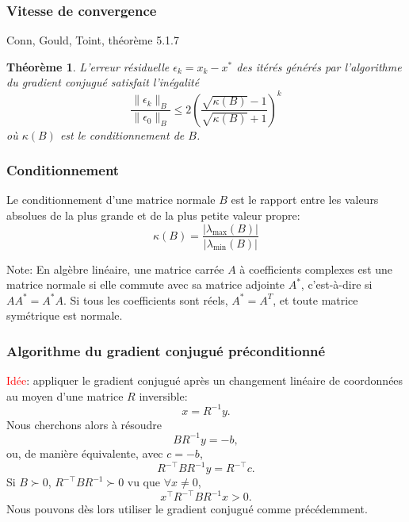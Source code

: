 \documentclass[usepdftitle=false,aspectratio=169]{beamer}
\newtheorem{thm}{Théorème}
\begin{document}
\begin{frame}
\frametitle{Vitesse de convergence}

Conn, Gould, Toint, théorème 5.1.7

\begin{thm}
L'erreur résiduelle $\epsilon_k = x_k - x^*$ des itérés générés par l'algorithme du gradient conjugué satisfait l'inégalité
$$
\frac{\| \epsilon_k \|_B}{\| \epsilon_0 \|_B}
\leq 2\left( \frac{\sqrt{\kappa(B)}-1}{\sqrt{\kappa(B)}+1} \right)^k
$$
où $\kappa(B)$ est le conditionnement de $B$.
\end{thm}

\end{frame}

\begin{frame}
\frametitle{Conditionnement}

Le conditionnement d'une matrice normale $B$ est le rapport entre les valeurs absolues de la plus grande et de la plus petite valeur propre:
$$
\kappa(B) = \frac{| \lambda_{\max}(B) |}{| \lambda_{\min}(B) |}
$$

\mbox{}

Note: En algèbre linéaire, une matrice carrée $A$ à coefficients complexes est une matrice normale si elle commute avec sa matrice adjointe $A^*$, c'est-à-dire si $AA^* = A^*A$. Si tous les coefficients sont réels, $A^* = A^T$, et toute matrice symétrique est normale.

\end{frame}

\begin{frame}
\frametitle{Algorithme du gradient conjugué préconditionné}

\textcolor{red}{Idée}: appliquer le gradient conjugué après un changement linéaire de coordonnées au moyen d'une matrice $R$ inversible:
$$
x = R^{-1}y.
$$ Nous cherchons alors à résoudre
$$
BR^{-1}y = -b,
$$
ou, de manière équivalente, avec $c = -b$,
$$
R^{-\top}BR^{-1}y = R^{-\top}c.
$$
Si $B \succ 0$, $R^{-\top}BR^{-1} \succ 0$ vu que $\forall x \ne 0$,
$$
x^\top R^{-\top}BR^{-1}x > 0.
$$
Nous pouvons dès lors utiliser le gradient conjugué comme précédemment.

\mbox{}


\end{frame}
\end{document}
